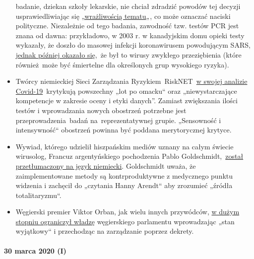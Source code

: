 \begin{itemize}
  badanie, dziekan szkoły lekarskie, nie chciał zdradzić powodów tej
  decyzji usprawiedliwiając się
  „\href{https://www.npr.org/sections/health-shots/2020/03/26/822084429/in-defense-of-coronavirus-testing-strategy-administration-cited-retracted-study}{wrażliwością
  tematu}„, co może oznaczać naciski polityczne. Niezależnie od tego
  badania, zawodność tzw. testów PCR jest znana od dawna: przykładowo, w
  2003 r. w kanadyjskim domu opieki testy wykazały, że doszło do masowej
  infekcji koronawirusem powodującym SARS,
  \href{https://www.ncbi.nlm.nih.gov/pmc/articles/PMC2095096/}{jednak
  później okazało się},~że był to wirusy zwykłego przeziębienia (które
  również~może być śmiertelne dla określonych grup wysokiego ryzyka).
\item
  Twórcy niemieckiej Sieci Zarządzania
  Ryzykiem~RiskNET~\href{https://www.risknet.de/themen/risknews/covid-19-und-der-blindflug/}{w
  swojej analizie Covid-19}~krytykują powszechny „lot po omacku`` oraz
  „niewystarczające kompetencje w zakresie oceny i etyki danych''.
  Zamiast zwiększania ilości testów i wprowadzania nowych obostrzeń
  potrzebne jest przeprowadzenia~badań na~reprezentatywnej grupie.
  „Sensowność i intensywność`` obostrzeń powinna być poddana
  merytorycznej krytyce.
\item
  Wywiad, którego udzielił hiszpańskim mediów uznany na całym świecie
  wirusolog, Francuz argentyńskiego pochodzenia Pablo
  Goldschmidt,~\href{https://www.rubikon.news/artikel/der-corona-totalitarismus}{został
  przetłumaczony na język niemiecki}. Goldschmidt uważa, że
  zaimplementowane metody są kontrproduktywne z medycznego punktu
  widzenia i zachęcił do „czytania Hanny Arendt`` aby zrozumieć „źródła
  totalitaryzmu``.
\item
  Węgierski premier Viktor Orban, jak wielu innych przywódców,
  \href{https://www.krone.at/2127086}{w dużym stopniu ograniczył władzę}
  węgierskiego parlamentu wprowadzając „stan wyjątkowy`` i przechodząc
  na zarządzanie poprzez dekrety.
\end{itemize}

\hypertarget{30-marca-2020-i}{%
\paragraph{30 marca 2020 (I)}\label{30-marca-2020-i}}

